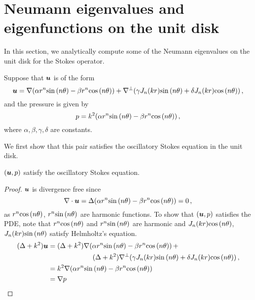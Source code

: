 \section{Neumann eigenvalues and eigenfunctions on the unit disk}
In this section, we analytically compute some of the Neumann eigenvalues
on the unit disk for the Stokes operator.

Suppose that ${\boldsymbol u}$ is of the form
\begin{equation}
{\boldsymbol u} = \nabla (\alpha r^{n} {\sin{(n \theta)}} - \beta r^{n} {\cos{(n \theta)}}) + \nabla^{\perp}(\gamma J_{n}(kr) {\sin{(n \theta)}} + \delta J_{n}(kr) {\cos{(n \theta)}}) \, ,
\end{equation}
and the pressure is given by
\begin{equation}
p = k^2 (\alpha r^{n} {\sin{(n \theta)}} - \beta r^{n} {\cos{(n \theta)}}) \, ,
\end{equation}
where $\alpha,\beta,\gamma,\delta$ are constants.

We first show that this pair satisfies the oscillatory Stokes equation
in the unit disk.
\begin{lemma}
$({\boldsymbol u},p)$ satisfy the oscillatory Stokes equation.
\end{lemma}
\begin{proof}
${\boldsymbol u}$ is divergence free since
\begin{equation}
\nabla \cdot {\boldsymbol u}  = \Delta (\alpha r^{n} {\sin{(n \theta)}} - \beta r^{n} {\cos{(n \theta)}}) = 0 \, ,
\end{equation}
as $r^{n} {\cos{(n \theta)}}$,  $r^{n} {\sin{(n \theta)}}$ are harmonic functions. 
To show that $({\boldsymbol u},p)$ satisfies the PDE, note that
$r^{n} {\cos{(n \theta)}}$ and $r^{n} {\sin{(n \theta)}}$ are harmonic
and $J_{n}(kr) {\cos{(n \theta)}}$, $J_{n}(kr) {\sin{(n \theta)}}$ satisfy Helmholtz's equation.
\begin{equation}
\begin{aligned}
(\Delta + k^2) \bu &= (\Delta + k^2) \nabla (\alpha r^{n} \sint - \beta r^{n} \cost) \, + \\
\quad & \hspace*{15ex} (\Delta + k^2) \nabla^{\perp} (\gamma \jnkr \sint + \delta \jnkr \cost) \, , \\
&= k^2 \nabla (\alpha r^{n} \sint - \beta r^{n} \cost) \\ 
&= \nabla p
\end{aligned}
\end{equation}
\end{proof}

